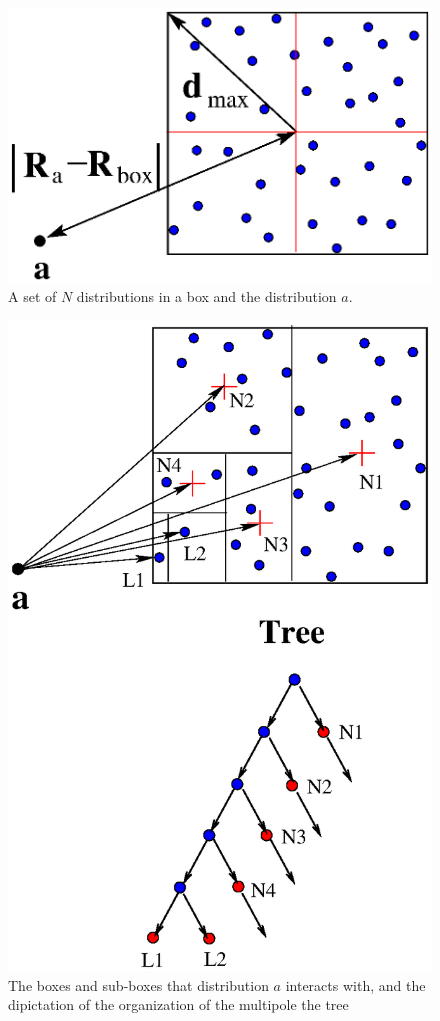 \documentclass[prb,aps,nobibnotes,superbib,preprint]{revtex4}
\begin{document}
\eject
%
%
%
\begin{figure}
\caption{A set of $N$ distributions in a box and the distribution $a$.}
{\centering \includegraphics {MultInBox.ps} \par} 
\label{figure:MultInBox} 
\end{figure}

\begin{figure}
\caption{The boxes and sub-boxes that distribution $a$ interacts with, and the dipictation of the
organization of the multipole the tree}
{\centering \includegraphics {TreeInBox.ps} \par} 
\label{figure:TreeInBox} 
\end{figure}
\end{document}
